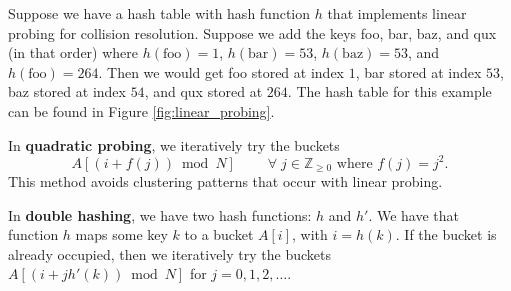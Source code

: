 \begin{example}
    Suppose we have a hash table with hash function $h$ that implements linear probing for collision resolution. Suppose we add the keys foo, bar, baz, and qux (in that order) where $h(\text{foo})=1$, $h(\text{bar})=53$, $h(\text{baz})=53$, and $h(\text{foo})=264$. Then we would get foo stored at index $1$, bar stored at index $53$, baz stored at index $54$, and qux stored at $264$. The hash table for this example can be found in Figure \ref{fig:linear_probing}. 
\end{example}

\begin{definition}
    In \textbf{quadratic probing}, we iteratively try the buckets \[A[(i+f(j))\bmod N]\qquad\;\forall\;j\in\mathbb Z_{\geq0}\text{ where }f(j)=j^2.\] This method avoids clustering patterns that occur with linear probing.
\end{definition}

\begin{definition}
    In \textbf{double hashing}, we have two hash functions: $h$ and $h'$. We have that function $h$ maps some key $k$ to a bucket $A[i]$, with $i=h(k)$. If the bucket is already occupied, then we iteratively try the buckets $A[(i+jh'(k))\bmod N]$ for $j=0,1,2,\ldots$.
\end{definition}

